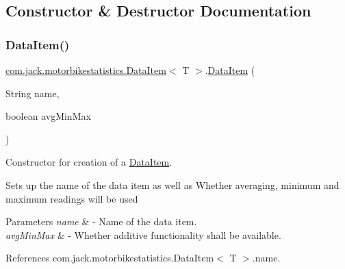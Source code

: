 \subsection{Constructor \& Destructor Documentation}
\mbox{\label{classcom_1_1jack_1_1motorbikestatistics_1_1_data_item_ae7367bc22bb0d8dc831944c7ce4f39f9}} 
\subsubsection{\texorpdfstring{Data\+Item()}{DataItem()}\hspace{0.1cm}{\footnotesize\ttfamily [1/2]}}
{\footnotesize\ttfamily \hyperlink{classcom_1_1jack_1_1motorbikestatistics_1_1_data_item}{com.\+jack.\+motorbikestatistics.\+Data\+Item}$<$ T $>$.\hyperlink{classcom_1_1jack_1_1motorbikestatistics_1_1_data_item}{Data\+Item} (\begin{DoxyParamCaption}\item[{String}]{name,  }\item[{boolean}]{avg\+Min\+Max }\end{DoxyParamCaption})\hspace{0.3cm}{\ttfamily [inline]}}



Constructor for creation of a \hyperlink{classcom_1_1jack_1_1motorbikestatistics_1_1_data_item}{Data\+Item}. 

Sets up the name of the data item as well as Whether averaging, minimum and maximum readings will be used


\begin{DoxyParams}{Parameters}
{\em name} & -\/ Name of the data item. \\
\hline
{\em avg\+Min\+Max} & -\/ Whether additive functionality shall be available. \\
\hline
\end{DoxyParams}


References com.\+jack.\+motorbikestatistics.\+Data\+Item$<$ T $>$.\+name.


